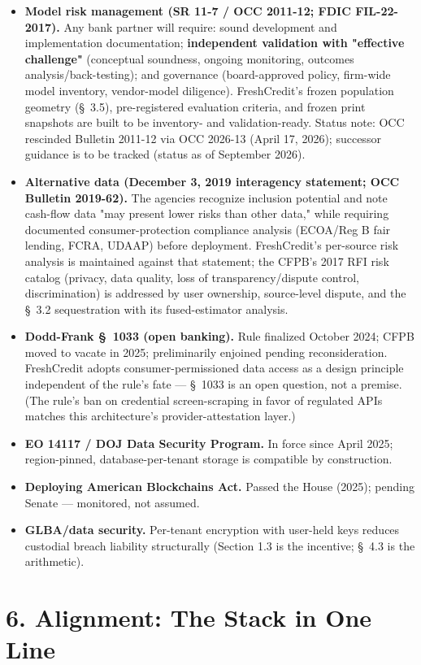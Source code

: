 \documentclass[11pt,twocolumn]{article}
\begin{document}
\begin{itemize}
\item \textbf{Model risk management (SR 11-7 / OCC 2011-12; FDIC FIL-22-2017).} Any bank partner will require: sound development and implementation documentation; \textbf{independent validation with "effective challenge"} (conceptual soundness, ongoing monitoring, outcomes analysis/back-testing); and governance (board-approved policy, firm-wide model inventory, vendor-model diligence). FreshCredit's frozen population geometry (\S~3.5), pre-registered evaluation criteria, and frozen print snapshots are built to be inventory- and validation-ready. Status note: OCC rescinded Bulletin 2011-12 via OCC 2026-13 (April 17, 2026); successor guidance is to be tracked (status as of September 2026).
\item \textbf{Alternative data (December 3, 2019 interagency statement; OCC Bulletin 2019-62).} The agencies recognize inclusion potential and note cash-flow data "may present lower risks than other data," while requiring documented consumer-protection compliance analysis (ECOA/Reg B fair lending, FCRA, UDAAP) before deployment. FreshCredit's per-source risk analysis is maintained against that statement; the CFPB's 2017 RFI risk catalog (privacy, data quality, loss of transparency/dispute control, discrimination) is addressed by user ownership, source-level dispute, and the \S~3.2 sequestration with its fused-estimator analysis.
\item \textbf{Dodd-Frank \S~1033 (open banking).} Rule finalized October 2024; CFPB moved to vacate in 2025; preliminarily enjoined pending reconsideration. FreshCredit adopts consumer-permissioned data access as a design principle independent of the rule's fate --- \S~1033 is an open question, not a premise. (The rule's ban on credential screen-scraping in favor of regulated APIs matches this architecture's provider-attestation layer.)
\item \textbf{EO 14117 / DOJ Data Security Program.} In force since April 2025; region-pinned, database-per-tenant storage is compatible by construction.
\item \textbf{Deploying American Blockchains Act.} Passed the House (2025); pending Senate --- monitored, not assumed.
\item \textbf{GLBA/data security.} Per-tenant encryption with user-held keys reduces custodial breach liability structurally (Section 1.3 is the incentive; \S~4.3 is the arithmetic).
\end{itemize}

\section*{6. Alignment: The Stack in One Line}
\end{document}

